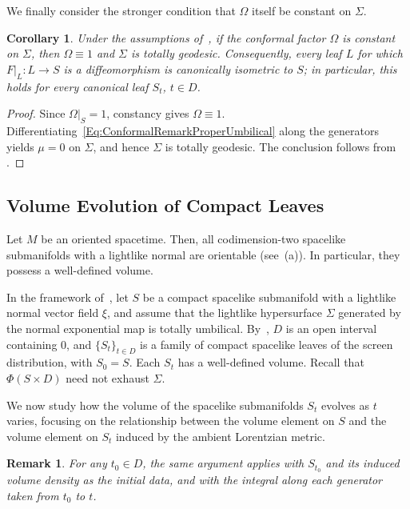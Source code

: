 \documentclass[11pt]{article}
\numberwithin{equation}{section}
\newtheorem{corollary}[theorem]{Corollary}
\newtheorem{remark}[theorem]{Remark}
\begin{document}
	We finally consider the stronger condition that $\Omega$ itself be
	constant on $\Sigma$.



\begin{corollary}\label{Cor:Omega_cte}
		Under the assumptions of~, if the
		conformal factor $\Omega$ is constant on $\Sigma$, then
		$\Omega\equiv1$ and $\Sigma$ is totally geodesic. Consequently,
		every leaf $L$ for which $F|_L\colon L\to S$ is a diffeomorphism
		is canonically isometric to $S$; in particular, this holds for every
		canonical leaf $S_t$, $t\in D$.
	\end{corollary}
	\begin{proof}
		Since $\Omega|_S=1$, constancy gives $\Omega\equiv1$.
		Differentiating~\eqref{Eq:ConformalRemarkProperUmbilical} along the
		generators yields $\mu=0$ on $\Sigma$, and hence $\Sigma$ is
		totally geodesic. The conclusion follows from
		.
	\end{proof}





\subsection{Volume Evolution of Compact Leaves}

Let \(M\) be an oriented spacetime. Then, all codimension-two spacelike submanifolds with a lightlike normal are orientable (see~(a)). In particular, they possess a well-defined volume.

In the framework of~, let \(S\) be a compact spacelike submanifold with a lightlike normal vector field \(\xi\), and assume that the lightlike hypersurface \(\Sigma\) generated by the normal exponential map is totally umbilical. By~, \(D\) is an open interval containing \(0\), and \(\{S_t\}_{t\in D}\) is a family of compact spacelike leaves of the screen distribution, with \(S_0=S\). Each \(S_t\) has a well-defined volume. Recall that \(\Phi(S\times D)\) need not exhaust \(\Sigma\).

We now study how the volume of the spacelike submanifolds \(S_t\) evolves as \(t\) varies, focusing on the relationship between the volume element on \(S\) and the volume element on \(S_t\) induced by the ambient Lorentzian metric.

\begin{remark}\normalfont
	For any $t_0\in D$, the same argument applies with $S_{t_0}$ and its induced volume density as the initial data, and with the integral along each generator taken from $t_0$ to $t$.
\end{remark}
\end{document}

